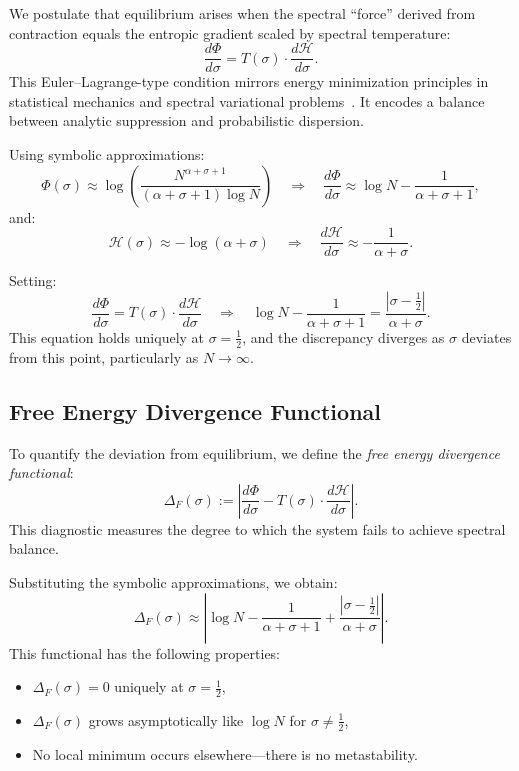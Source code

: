 \documentclass[12pt]{article}
\begin{document}
We postulate that equilibrium arises when the spectral “force” derived from contraction equals the entropic gradient scaled by spectral temperature:
\[
\frac{d\Phi}{d\sigma} = T(\sigma) \cdot \frac{d\mathcal{H}}{d\sigma}.
\]
This Euler--Lagrange-type condition mirrors energy minimization principles in statistical mechanics and spectral variational problems~\cite{ellis1985entropy}. It encodes a balance between analytic suppression and probabilistic dispersion.

Using symbolic approximations:
\[
\Phi(\sigma) \approx \log \left( \frac{N^{\alpha+\sigma+1}}{(\alpha+\sigma+1) \log N} \right)
\quad \Rightarrow \quad 
\frac{d\Phi}{d\sigma} \approx \log N - \frac{1}{\alpha + \sigma + 1},
\]
and:
\[
\mathcal{H}(\sigma) \approx -\log(\alpha + \sigma) 
\quad \Rightarrow \quad 
\frac{d\mathcal{H}}{d\sigma} \approx -\frac{1}{\alpha + \sigma}.
\]

Setting:
\[
\frac{d\Phi}{d\sigma} = T(\sigma) \cdot \frac{d\mathcal{H}}{d\sigma}
\quad \Rightarrow \quad 
\log N - \frac{1}{\alpha + \sigma + 1} = \frac{|\sigma - \tfrac{1}{2}|}{\alpha + \sigma}.
\]
This equation holds uniquely at $\sigma = \tfrac{1}{2}$, and the discrepancy diverges as $\sigma$ deviates from this point, particularly as $N \to \infty$.

\subsection{Free Energy Divergence Functional}

To quantify the deviation from equilibrium, we define the \emph{free energy divergence functional}:
\[
\Delta_F(\sigma) := \left| \frac{d\Phi}{d\sigma} - T(\sigma) \cdot \frac{d\mathcal{H}}{d\sigma} \right|.
\]
This diagnostic measures the degree to which the system fails to achieve spectral balance.

Substituting the symbolic approximations, we obtain:
\[
\Delta_F(\sigma) \approx \left| \log N - \frac{1}{\alpha + \sigma + 1} + \frac{|\sigma - \tfrac{1}{2}|}{\alpha + \sigma} \right|.
\]
This functional has the following properties:
\begin{itemize}
    \item $\Delta_F(\sigma) = 0$ uniquely at $\sigma = \tfrac{1}{2}$,
    \item $\Delta_F(\sigma)$ grows asymptotically like $\log N$ for $\sigma \ne \tfrac{1}{2}$,
    \item No local minimum occurs elsewhere—there is no metastability.
\end{itemize}
\end{document}
